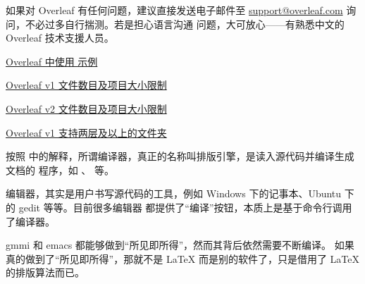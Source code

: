 如果对 Overleaf 有任何问题，建议直接发送电子邮件至
\href{mailto:support@overleaf.com}{support@overleaf.com} 询问，不必过多自行揣测。若是担心语言沟通
问题，大可放心——有熟悉中文的 Overleaf 技术支援人员。

\begin{reference}
  \item \href{https://www.overleaf.com/read/qphhfvnsddbs}{Overleaf 中使用  示例}
  \item \href{https://www.overleaf.com/help/297}{Overleaf v1 文件数目及项目大小限制}
  \item \href{https://www.sharelatex.com/learn/Uploading_a_project#Limitations_on_Uploads}{Overleaf v2 文件数目及项目大小限制}
  \item \href{https://www.overleaf.com/help/187}{Overleaf v1 支持两层及以上的文件夹}
\end{reference}



按照  中的解释，所谓编译器，真正的名称叫排版引擎，是读入源代码并编译生成文档的
程序，如 \pdfTeX{}、\XeTeX{} 等。

编辑器，其实是用户书写源代码的工具，例如 Windows 下的记事本、Ubuntu 下的 gedit 等等。目前很多编辑器
都提供了“编译”按钮，本质上是基于命令行调用了编译器。


gmmi 和 emacs 都能够做到“所见即所得”，然而其背后依然需要不断编译。
如果真的做到了“所见即所得”，那就不是 \LaTeX{} 而是别的软件了，只是借用了 \LaTeX{} 的排版算法而已。


